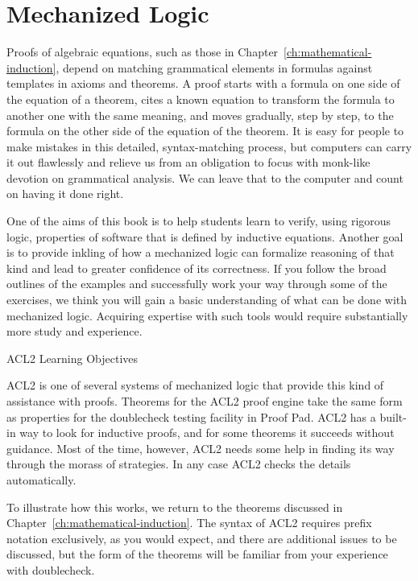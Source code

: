 \chapter{Mechanized Logic}
\label{ch:mechanized-logic}

Proofs of algebraic equations,
such as those in Chapter~\ref{ch:mathematical-induction},
depend on matching grammatical elements in formulas
against templates in axioms and theorems.
A proof starts with a formula on one side
of the equation of a theorem,
cites a known equation to transform the formula
to another one with the same meaning,
and moves gradually, step by step, to the formula
on the other side of the equation of the theorem.
It is easy for people to make mistakes in this detailed, syntax-matching process,
but computers can carry it out flawlessly and
relieve us from an obligation to focus with monk-like devotion on grammatical analysis.
We can leave that to the computer and count on having it done right.

\begin{aside}
One of the aims of this book is to help students learn to
verify, using rigorous logic, properties of software
that is defined by inductive equations.
Another goal is to provide
inkling of how a mechanized logic
can formalize reasoning of that kind
and lead to greater confidence of its correctness.
If you follow the broad outlines of the examples
and successfully work your way through some of the exercises,
we think you will gain a basic understanding
of what can be done with mechanized logic.
Acquiring expertise with such tools
would require substantially more study and experience.
\caption{ACL2 Learning Objectives}
\label{aside:acl2-learning-objectives}
\end{aside}

ACL2 is one of several systems of mechanized logic that provide this
kind of assistance with proofs.
Theorems for the ACL2 proof engine take the same form
as properties for the doublecheck testing facility in Proof Pad.
ACL2 has a built-in way to look for inductive proofs,
and for some theorems it succeeds without guidance.
Most of the time, however, ACL2 needs some help in
finding its way through the morass of strategies.
In any case ACL2 checks the details automatically.

To illustrate how this works, we return to the theorems
discussed in Chapter~\ref{ch:mathematical-induction}.
The syntax of ACL2 requires prefix notation exclusively,
as you would expect, and there are additional issues
to be discussed, but the form of the theorems
will be familiar from your experience with doublecheck.

